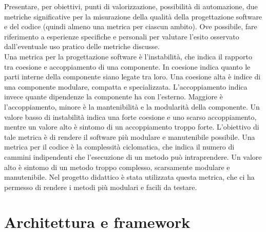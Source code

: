 Presentare, per obiettivi, punti di valorizzazione, possibilità di automazione, due metriche significative per la
misurazione della qualità della progettazione software e del codice (quindi almeno una metrica per ciascun ambito). Ove possibile, fare riferimento a esperienze specifiche e personali per valutare l'esito osservato dall'eventuale uso pratico delle metriche discusse. \\

Una metrica per la progettazione software è l'instabilità, che indica il rapporto tra coesione e accoppiamento di una
componente. In coesione indica quanto le parti interne della componente siano legate tra loro. Una coesione alta è
indice di una componente modulare, compatta e specializzata. L'accoppiamento indica invece quante dipendenze la
componente ha con l'esterno. Maggiore è l'accoppiamento, minore è la mantenibilità e la modularità della componente.
Un valore basso di instabilità indica una forte coesione e uno scarso accoppiamento, mentre un valore alto è sintomo di
un accoppiamento troppo forte. L'obiettivo di tale metrica è di rendere il software più modulare e manutenibile
possibile. Una metrica per il codice è la complessità ciclomatica, che indica il numero di cammini indipendenti che
l'esecuzione di un metodo può intraprendere. Un valore alto è sintomo di un metodo troppo complesso, scarsamente
modulare e manutenibile. Nel progetto didattico è stata utilizzata questa metrica, che ci ha permesso di rendere i metodi
più modulari e facili da testare.

\section{Architettura e framework}

